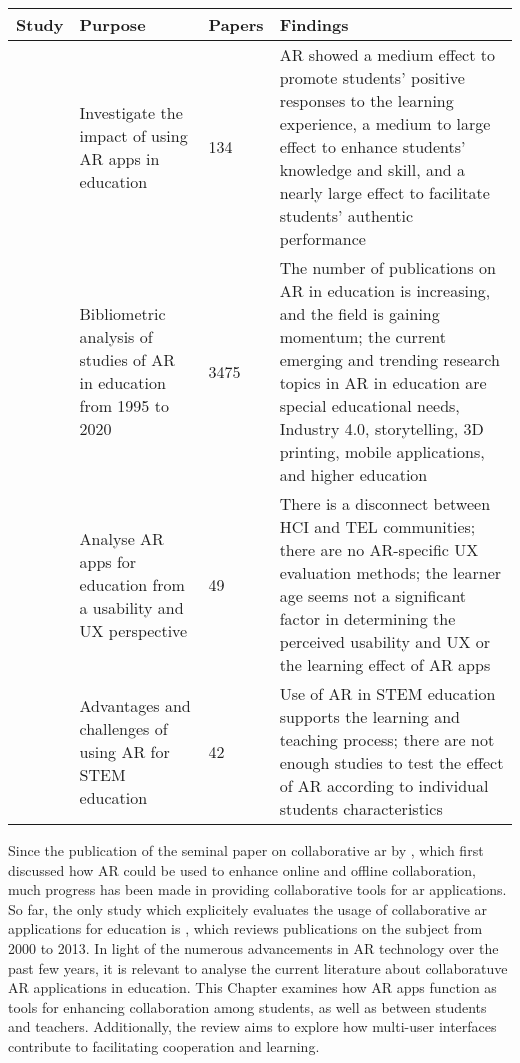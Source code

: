 \begin{table*}[htbp]
\caption{\fontsize{10pt}{11pt}}
\label{tab:slrsummary}
\small
\begin{tabular}{M{2.7cm}M{2.9cm}M{1.2cm}M{4.7cm}}
    \toprule
         \textbf{Study} & \textbf{Purpose} & \textbf{Papers} & \textbf{Findings} \\
    \midrule
         \cite{chang2022ten} & Investigate the impact of using AR apps in education & 134 & AR showed a medium effect to promote students’ positive responses to the learning experience, a medium to large effect to enhance students’ knowledge and skill, and a nearly large effect to facilitate students’ authentic performance \\
    \midrule     
          \cite{avila2021augmented} & Bibliometric analysis of studies of AR in education from 1995 to 2020 & 3475 & The number of publications on AR in education is increasing, and the field is gaining momentum; the current emerging and trending research topics in AR in education are special educational needs, Industry 4.0, storytelling, 3D printing, mobile applications, and higher education \\
   \midrule 
        \cite{law2021augmented} & Analyse AR apps for education from a usability and UX perspective & 49 & There is a disconnect between HCI and TEL communities; there are no AR-specific UX evaluation methods; the learner age seems not a significant factor in determining the perceived usability and UX or the learning effect of AR apps \\
    \midrule
         \cite{sirakaya2022augmented} & Advantages and challenges of using AR for STEM education & 42 & Use of AR in STEM education supports the learning and teaching process; there are not enough studies to test the effect of AR according to individual students characteristics \\
    \bottomrule

\end{tabular}
\end{table*}

Since the publication of the seminal paper on collaborative \gls{ar} by \cite{billinghurst2002collaborative}, which first discussed how AR could be used to enhance online and offline collaboration, much progress has been made in providing collaborative tools for \gls{ar} applications. So far, the only study which explicitely  evaluates the usage of collaborative \gls{ar} applications for education is \citep{6821833}, which reviews publications on the subject from 2000 to 2013. In light of the numerous advancements in AR technology over the past few years, it is relevant to analyse the current literature about collaboratuve AR applications in education. This Chapter examines how AR apps function as tools for enhancing collaboration among students, as well as between students and teachers. Additionally, the review aims to explore how multi-user interfaces contribute to facilitating cooperation and learning.

